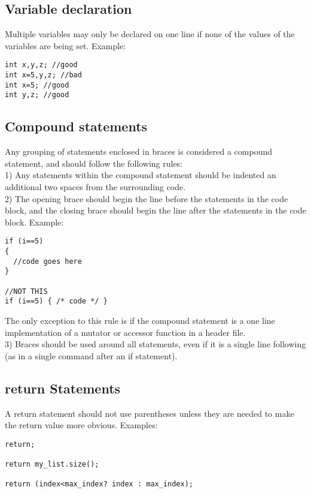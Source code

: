 \documentclass[letterpaper,10pt]{article}
\begin{document}
\subsection{Variable declaration}
Multiple variables may only be declared on one line if none of the values of the variables are being set. Example:
\begin{verbatim}
int x,y,z; //good
int x=5,y,z; //bad
int x=5; //good
int y,z; //good
\end{verbatim}
\subsection{Compound statements}
Any grouping of statements enclosed in braces is considered a compound statement, and should follow the following rules:\\
1) Any statements within the compound statement should be indented an additional two spaces from the surrounding code.\\
2) The opening brace should begin the line before the statements in the code block, and the closing brace should begin the line after the statements in the code block.  Example: \\
\begin{verbatim}
if (i==5)
{
  //code goes here
}

//NOT THIS
if (i==5) { /* code */ }
\end{verbatim}
The only exception to this rule is if the compound statement is a one line implementation of a mutator or accessor function in a header file.\\
3) Braces should be used around all statements, even if it is a single line following (as in a single command after an if statement).
\subsection{return Statements}
A return statement should not use parentheses unless they are needed to make the return value more obvious.  Examples:
\begin{verbatim}
return;

return my_list.size();

return (index<max_index? index : max_index);
\end{verbatim}
\end{document}
